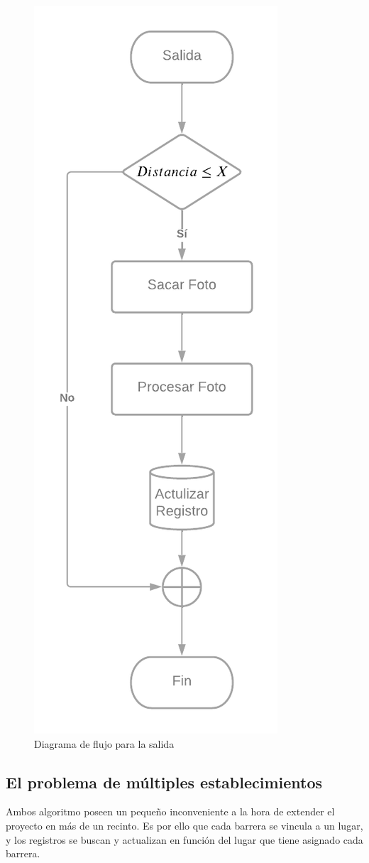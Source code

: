 \begin{figure}
    \centering
    \includegraphics[width=.5\textwidth]{imgs/flujo-salida.png}
    \caption{Diagrama de flujo para la salida}
    \label{fig:flujo-salida}
\end{figure}

\subsection{El problema de múltiples establecimientos}

Ambos algoritmo poseen un pequeño inconveniente a la hora de extender el proyecto en más de un recinto. Es por ello que cada barrera se vincula a un lugar, y los registros se buscan y actualizan en función del lugar que tiene asignado cada barrera.

